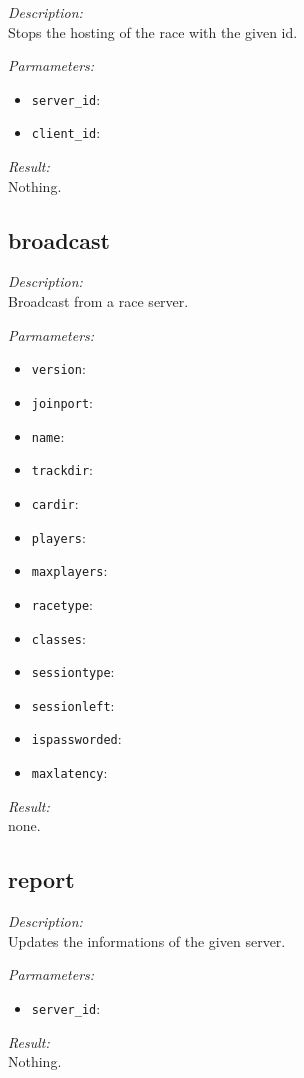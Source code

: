 \begin{description}
\item {\it Description:}\\
Stops the hosting of the race with the given id.
\item {\it Parmameters:}
\begin{itemize}
\item {\tt server\_id}: 
\item {\tt client\_id}: 
\end{itemize}
\item {\it Result:}\\
Nothing.
\end{description}

\subsection{broadcast}

\begin{description}
\item {\it Description:}\\
Broadcast from a race server.
\item {\it Parmameters:}
\begin{itemize}
\item {\tt version}: 
\item {\tt joinport}: 
\item {\tt name}: 
\item {\tt trackdir}: 
\item {\tt cardir}: 
\item {\tt players}: 
\item {\tt maxplayers}: 
\item {\tt racetype}: 
\item {\tt classes}: 
\item {\tt sessiontype}: 
\item {\tt sessionleft}: 
\item {\tt ispassworded}: 
\item {\tt maxlatency}: 
\end{itemize}
\item {\it Result:}\\
none.
\end{description}

\subsection{report}

\begin{description}
\item {\it Description:}\\
Updates the informations of the given server.
\item {\it Parmameters:}
\begin{itemize}
\item {\tt server\_id}: 
\end{itemize}
\item {\it Result:}\\
Nothing.
\end{description}

